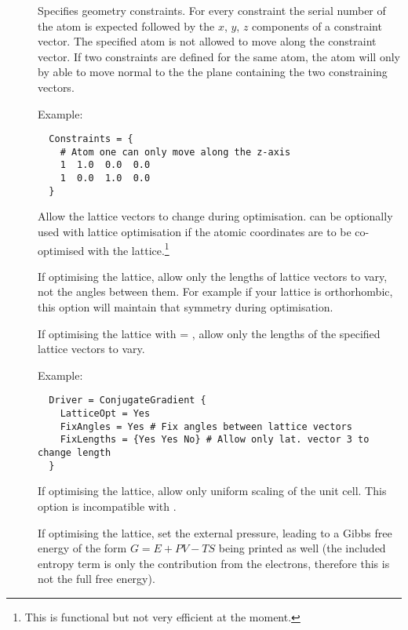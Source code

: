 \begin{description}
\item[] Specifies geometry constraints. For every
  constraint the serial number of the atom is expected followed by the
  $x$, $y$, $z$ components of a constraint vector. The specified atom
  is not allowed to move along the constraint vector. If two
  constraints are defined for the same atom, the atom will only by
  able to move normal to the the plane containing the two constraining
  vectors.

  Example:
  \invparskip
\begin{verbatim}
  Constraints = {
    # Atom one can only move along the z-axis
    1  1.0  0.0  0.0
    1  0.0  1.0  0.0
  }
\end{verbatim}

\item[] Allow the lattice vectors to change during
  optimisation.  can be optionally used with lattice
  optimisation if the atomic coordinates are to be co-optimised with
  the lattice.\footnote{This is functional but not very efficient at
    the moment.}

\item[] If optimising the lattice, allow only the
  lengths of lattice vectors to vary, not the angles between them. For
  example if your lattice is orthorhombic, this option will maintain
  that symmetry during optimisation.

\item[] If optimising the lattice with  =
  , allow only the lengths of the specified lattice vectors to
  vary.

  Example:
  \invparskip
\begin{verbatim}
  Driver = ConjugateGradient {
    LatticeOpt = Yes
    FixAngles = Yes # Fix angles between lattice vectors
    FixLengths = {Yes Yes No} # Allow only lat. vector 3 to change length
  }
\end{verbatim}

\item[] If optimising the lattice, allow only uniform
  scaling of the unit cell. This option is incompatible with
  .

\item[] If optimising the lattice, set
  the external pressure, leading to a Gibbs free energy of the form $G = E + PV
  - TS$ being printed as well (the included entropy term is only the
  contribution from the electrons, therefore this is not the full free energy).


\end{description}
